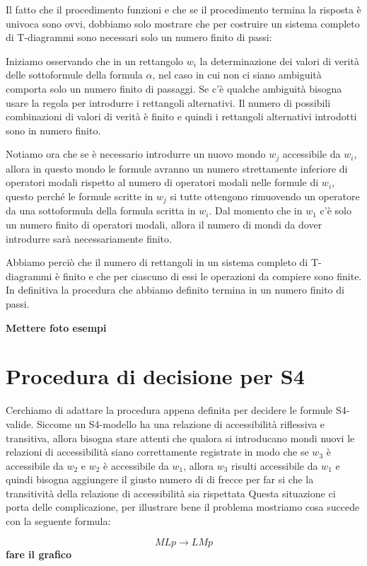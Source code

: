 \documentclass[a4paper, titlepage, 12pt]{report}
\begin{document}
Il fatto che il procedimento funzioni e che se il procedimento termina la risposta è univoca
sono ovvi, dobbiamo solo mostrare che per costruire un sistema completo di T-diagrammi
sono necessari solo un numero finito di passi:

Iniziamo osservando che in un rettangolo $w_i$
la determinazione dei valori di verità delle sottoformule della formula $\alpha$,
nel caso in cui non ci siano ambiguità comporta solo un numero finito di passaggi.
Se c'è qualche ambiguità bisogna usare la regola per introdurre i rettangoli alternativi.
Il numero di possibili combinazioni di valori di verità è finito e quindi
i rettangoli alternativi introdotti sono in numero finito.

Notiamo ora che se è necessario introdurre un nuovo mondo $w_j$ accessibile da $w_i$,
allora in questo mondo le formule avranno un numero strettamente inferiore di operatori
modali rispetto al numero di operatori modali nelle formule di $w_i$, questo perché
le formule scritte in $w_j$ si tutte ottengono rimuovendo un operatore da una sottoformula
della formula scritta in $w_i$.
Dal momento che in $w_1$ c'è solo un numero finito di operatori
modali, allora il numero di mondi da dover introdurre sarà necessariamente finito.

Abbiamo perciò che il numero di rettangoli in un sistema completo di T-diagrammi è finito
e che per ciascuno di essi le operazioni da compiere sono finite. In definitiva
la procedura che abbiamo definito termina in un numero finito di passi.

\textbf{Mettere foto esempi}


\section{Procedura di decisione per S4}
Cerchiamo di adattare la procedura appena definita per decidere le formule S4-valide.
Siccome un S4-modello ha una relazione di accessibilità riflessiva e transitiva, allora bisogna stare
attenti che qualora si introducano mondi nuovi le relazioni di accessibilità siano
correttamente registrate in modo che se $w_3$ è accessibile da $w_2$ e $w_2$ è accessibile
da $w_1$, allora $w_3$ risulti accessibile da $w_1$ e quindi bisogna aggiungere il giusto
numero di di frecce per far si che la transitività della relazione di accessibilità sia rispettata
Questa situazione ci porta delle complicazione, per illustrare bene il problema
mostriamo cosa succede con la seguente formula:

$$MLp \rightarrow LMp$$
\textbf{fare il grafico}
\end{document}
